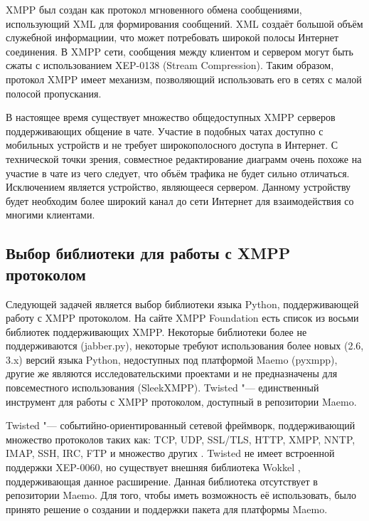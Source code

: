 XMPP был создан как протокол мгновенного обмена сообщениями, использующий XML
для формирования сообщений. XML создаёт большой объём служебной информациии, что
может потребовать широкой полосы Интернет соединения. В XMPP сети, сообщения
между клиентом и сервером могут быть сжаты с использованием XEP-0138 (Stream
Compression). Таким образом, протокол XMPP имеет механизм, позволяющий
использовать его в сетях с малой полосой пропускания.

В настоящее время существует множество общедоступных XMPP серверов
поддерживающих общение в чате. Участие в подобных чатах доступно с мобильных
устройств и не требует широкополосного доступа в Интернет. С технической точки
зрения, совместное редактирование диаграмм очень похоже на участие в чате из
чего следует, что объём трафика не будет сильно отличаться. Исключением является
устройство, являющееся сервером. Данному устройству будет необходим более
широкий канал до сети Интернет для взаимодействия со многими клиентами.


\subsection{Выбор библиотеки для работы с XMPP протоколом}
Следующей задачей является выбор библиотеки языка Python, поддерживающей работу
с XMPP протоколом. На сайте XMPP Foundation \cite{xmpp} есть список из восьми
библиотек поддерживающих XMPP. Некоторые библиотеки более не поддерживаются
(jabber.py), некоторые требуют использования более новых (2.6, 3.x) версий языка
Python, недоступных под платформой Maemo (pyxmpp), другие же являются
исследовательскими проектами и не предназначены для повсеместного использования
(SleekXMPP). Twisted "--- единственный инструмент для работы с XMPP протоколом,
доступный в репозитории Maemo.

Twisted "--- событийно-ориентированный сетевой фреймворк, поддерживающий
множество протоколов таких как: TCP, UDP, SSL/TLS, HTTP, XMPP, NNTP, IMAP, SSH,
IRC, FTP и множество других \cite{twisted}. Twisted не имеет встроенной
поддержки XEP-0060, но существует внешняя библиотека Wokkel \cite{wokkel},
поддерживающая данное расширение. Данная библиотека отсутствует в репозитории
Maemo. Для того, чтобы иметь возможность её использовать, было принято решение о
создании и поддержки пакета для платформы Maemo.


